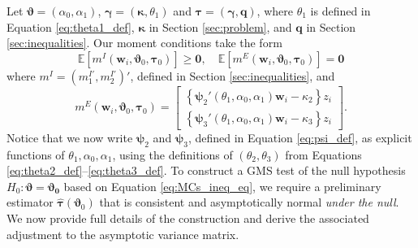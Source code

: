 Let $\boldsymbol{\vartheta} = (\alpha_0, \alpha_1)$, $\boldsymbol{\gamma} = (\boldsymbol{\kappa}, \theta_1)$ and $\boldsymbol{\tau} =  (\boldsymbol{\gamma}, \mathbf{q})$, where $\theta_1$ is defined in Equation \ref{eq:theta1_def}, $\boldsymbol{\kappa}$ in Section \ref{sec:problem}, and $\mathbf{q}$ in Section \ref{sec:inequalities}.
Our moment conditions take the form 
\begin{equation}
  \mathbb{E}[m^I(\mathbf{w}_i, \boldsymbol{\vartheta}_0, \boldsymbol{\tau}_0)] \geq \mathbf{0}, \quad 
  \mathbb{E}[m^E(\mathbf{w}_i, \boldsymbol{\vartheta}_0, \boldsymbol{\tau}_0)] = \mathbf{0}
  \label{eq:MCs_ineq_eq}
\end{equation}
where $m^I = (m_1^{I'}, m_2^{I'})'$, defined in Section \ref{sec:inequalities}, and 
\begin{equation}
  m^E(\mathbf{w}_i, \boldsymbol{\vartheta}_0, \boldsymbol{\tau}_0)= \left[
  \begin{array}{c}
 \left\{ \boldsymbol{\psi}_2'(\theta_1, \alpha_0, \alpha_1) \mathbf{w}_i - \kappa_2 \right\}z_i \\
 \left\{ \boldsymbol{\psi}_3'(\theta_1, \alpha_0, \alpha_1) \mathbf{w}_i - \kappa_3 \right\}z_i 
  \end{array}
\right].
\end{equation}
Notice that we now write $\boldsymbol{\psi}_2$ and $\boldsymbol{\psi}_3$, defined in Equation \ref{eq:psi_def}, as explicit functions of $\theta_1, \alpha_0, \alpha_1$, using the definitions of $(\theta_2, \theta_3)$ from Equations \ref{eq:theta2_def}--\ref{eq:theta3_def}.
To construct a GMS test of the null hypothesis $H_0\colon \boldsymbol{\vartheta} = \boldsymbol{\vartheta_0}$ based on Equation \ref{eq:MCs_ineq_eq}, we require a preliminary estimator $\widehat{\boldsymbol{\tau}}(\boldsymbol{\vartheta}_0)$ that is consistent and asymptotically normal \emph{under the null}.
We now provide full details of the construction and derive the associated adjustment to the asymptotic variance matrix.

